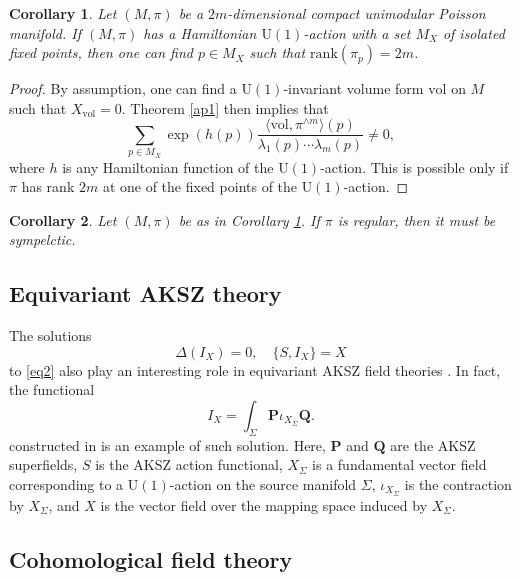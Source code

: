 \documentclass[12pt]{amsart}
\numberwithin{table}{section}
\numberwithin{equation}{section}
\newtheorem{cor}{Corollary}[section]
\theoremstyle{plain}
\newcommand{\U}{\mathrm{U}}
\newcommand{\vol}{\mathrm{vol}}
\begin{document}
\begin{cor}\label{unipoissrank}
	Let $(M,\pi)$ be a $2m$-dimensional compact unimodular Poisson manifold. If $(M,\pi)$ has a Hamiltonian $\mathrm{U}(1)$-action with a set $M_{X}$ of isolated fixed points, then one can find $p \in M_{X}$ such that $\mathrm{rank}(\pi_p)=2m$. 
\end{cor}
\begin{proof}
	By assumption, one can find a $\mathrm{U}(1)$-invariant volume form $\vol$ on $M$ such that $X_{\vol}=0$. Theorem \ref{ap1} then implies that 
	\[
	\sum_{p \in M_{X}}\exp(h(p))\frac{\langle \vol, \pi^{\wedge m}\rangle (p)}{\lambda_1(p)\cdots\lambda_m(p)}  \neq 0,
	\]
	where $h$ is any Hamiltonian function of the $\mathrm{U}(1)$-action. This is possible only if $\pi$ has rank $2m$ at one of the fixed points of the $\mathrm{U}(1)$-action. 
\end{proof}
\begin{cor}
	Let $(M,\pi)$ be as in Corollary \ref{unipoissrank}. If $\pi$ is regular, then it must be sympelctic.
\end{cor}

\subsection{Equivariant AKSZ theory}

The solutions
\[
\Delta(I_X) = 0, \quad \{S,I_X\}=X
\]
to \eqref{eq2} also play an interesting role in equivariant AKSZ field theories \cite{bonechi2020equivariant}. In fact, the functional
\[
I_X = \int_{\Sigma} \mathbf{P} \iota_{X_{\Sigma}} \mathbf{Q}. 
\]
constructed in \cite{bonechi2023towards} is an example of such solution. Here, $\mathbf{P}$ and $\mathbf{Q}$ are the AKSZ superfields, $S$ is the AKSZ action functional, $X_{\Sigma}$ is a fundamental vector field corresponding to a $\U(1)$-action on the source manifold $\Sigma$, $\iota_{X_{\Sigma}}$ is the contraction by $X_{\Sigma}$, and $X$ is the vector field over the mapping space induced by $X_{\Sigma}$. 


\subsection{Cohomological field theory}
\end{document}
